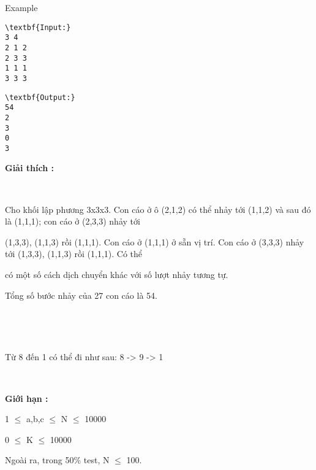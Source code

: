 Example
\begin{verbatim}
\textbf{Input:}
3 4
2 1 2
2 3 3
1 1 1
3 3 3\end{verbatim}
\begin{verbatim}
\textbf{Output:}
54
2
3
0
3\end{verbatim}

\textbf{Giải thích : }

 

Cho khối lập phương 3x3x3. Con cáo ở ô (2,1,2) có thể nhảy tới (1,1,2) và sau đó là (1,1,1); con cáo ở (2,3,3) nhảy tới

(1,3,3), (1,1,3) rồi (1,1,1). Con cáo ở (1,1,1) ở sẵn vị trí. Con cáo ở (3,3,3) nhảy tới (1,3,3), (1,1,3) rồi (1,1,1). Có thể

có một số cách dịch chuyển khác với số lượt nhảy tương tự.

Tổng số bước nhảy của 27 con cáo là 54.

 

 

Từ 8 đến 1 có thể đi như sau: 8 -> 9 -> 1

 

\textbf{Giới hạn : }

1 $\le$ a,b,c $\le$ N $\le$ 10000

0 $\le$ K $\le$ 10000

Ngoài ra, trong 50\% test, N $\le$ 100.